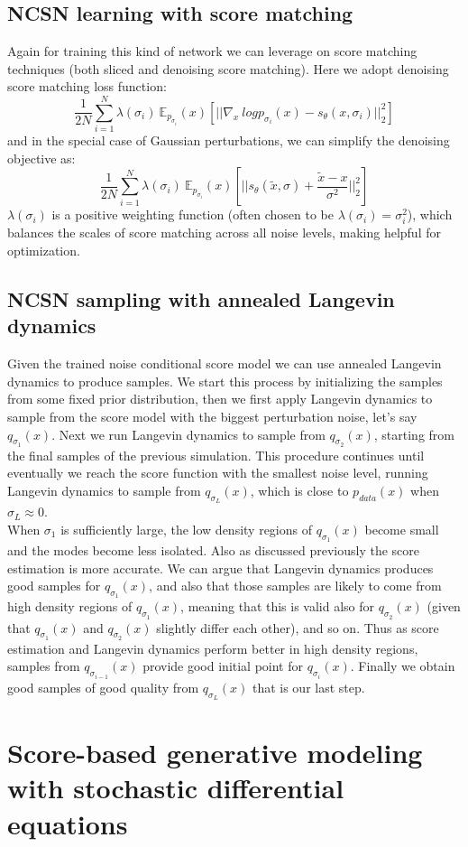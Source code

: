 \documentclass{article}
\begin{document}
    \subsection{NCSN learning with score matching}
    Again for training this kind of network we can leverage on score matching techniques (both sliced and denoising score matching). Here we adopt denoising score matching loss function:
    \begin{equation}
    \frac{1}{2N} \sum_{i=1}^{N} \lambda(\sigma_{i})\ \mathbb{E}_{p_{\sigma_{i}}}(x) [ || \nabla_{x}\ log {p_{\sigma_{i}}} (x) - s_{\theta}(x,\sigma_{i}) ||_{2}^{2}]
     \end{equation}
     and in the special case of Gaussian perturbations, we can simplify the denoising objective as:
     \begin{equation}
      \frac{1}{2N} \sum_{i=1}^{N} \lambda(\sigma_{i})\ \mathbb{E}_{p_{\sigma_{i}}}(x)[|| s_{\theta}(\tilde{x},\sigma)+ \frac{\tilde{x}-x}{\sigma^{2}}||_{2}^{2}]
     \end{equation}
     $\lambda(\sigma_{i})$ is a positive weighting function (often chosen to be $ \lambda(\sigma_{i}) = \sigma_{i}^{2} $), which balances the scales of score matching across all noise levels, making helpful for optimization.
     \subsection{NCSN sampling with annealed Langevin dynamics}
     Given the trained noise conditional score model we can use annealed Langevin dynamics to produce samples. We start this process by initializing the samples from some fixed prior distribution, then we first apply Langevin dynamics to sample from the score model with the biggest perturbation noise, let's say $q_{\sigma_{1}}(x)$. Next we run Langevin dynamics to sample from $q_{\sigma_{2}}(x)$, starting from the final samples of the previous simulation. This procedure continues until eventually we reach the score function with the smallest noise level, running Langevin dynamics to sample from $q_{\sigma_{L}}(x)$, which is close to $p_{data}(x)$ when $\sigma_{L} \approx 0$.\\
     \newline
     When $\sigma_{1}$ is sufficiently large, the low density regions of $q_{\sigma_{1}}(x)$ become small and the modes become less isolated. Also as discussed previously the score estimation is more accurate. We can argue that Langevin dynamics produces good samples for $q_{\sigma_{1}}(x)$, and also that those samples are likely to come from high density regions of $q_{\sigma_{1}}(x)$, meaning that this is valid also for $q_{\sigma_{2}}(x)$ (given that $q_{\sigma_{1}}(x)$ and $q_{\sigma_{2}}(x)$ slightly differ each other), and so on. Thus as score estimation and Langevin dynamics perform better in high density regions, samples from $q_{\sigma_{i-1}}(x)$ provide good initial point for $q_{\sigma_{i}}(x)$. Finally we obtain good samples of good quality from $q_{\sigma_{L}}(x)$ that is our last step.
     \newpage
     \section{Score-based generative modeling with stochastic differential equations}
     
\end{document}

